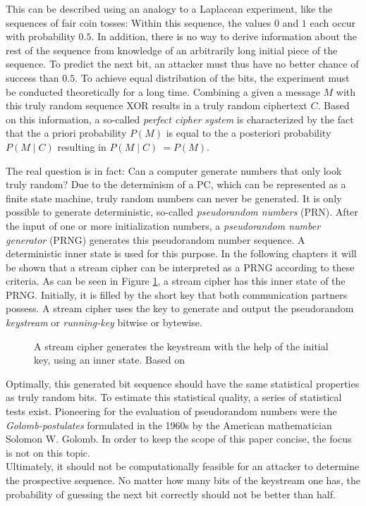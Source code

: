 This can be described using an analogy to a Laplacean experiment, like the sequences of fair coin tosses: Within this sequence, the values $0$ and $1$ each occur with probability $0.5$. In addition, there is no way to derive information about the rest of the sequence from knowledge of an arbitrarily long initial piece of the sequence. To predict the next bit, an attacker must thus have no better chance of success than $0.5$. To achieve equal distribution of the bits, the experiment must be conducted theoretically for a long time. Combining a given a message $M$ with this truly random sequence XOR results in a truly random ciphertext $C$. Based on this information, a so-called \textit{perfect cipher system} is characterized by the fact that the a priori probability $P\left(M\right)$ is equal to the a posteriori probability $P({M}\mid{C})$ resulting in $P({M}\mid{C})\ = P({M})$. \cite[pp. 52-23]{Ertel.2020}

\pagebreak

The real question is in fact: Can a computer generate numbers that only look truly random? Due to the determinism of a PC, which can be represented as a finite state machine, truly random numbers can never be generated. It is only possible to generate deterministic, so-called \textit{pseudorandom numbers} (PRN). After the input of one or more initialization numbers, a \textit{pseudorandom number generator} (PRNG) generates this pseudorandom number sequence. A deterministic inner state is used for this purpose. \cite[pp. 195-196]{Ertel.2020} In the following chapters it will be shown that a stream cipher can be interpreted as a PRNG according to these criteria. As can be seen in Figure \ref{fig:Figure_2}, a stream cipher has this inner state of the PRNG. Initially, it is filled by the short key that both communication partners possess. A stream cipher uses the key to generate and output the pseudorandom \textit{keystream} or \textit{running-key} bitwise or bytewise. \cite[p. 233]{Schneier.2006} \\

\begin{figure}[h]
	\centering
	
	\caption{A stream cipher generates the keystream with the help of the initial key, using an inner state. Based on \cite[p. 234]{Schneier.2006}}
	\label{fig:Figure_2}
\end{figure}

Optimally, this generated bit sequence should have the same statistical properties as truly random bits. To estimate this statistical quality, a series of statistical tests exist. Pioneering for the evaluation of pseudorandom numbers were the \textit{Golomb-postulates} formulated in the 1960s by the American mathematician Solomon W. Golomb. \cite[p. 43]{Golomb.1967} In order to keep the scope of this paper concise, the focus is not on this topic.\\

Ultimately, it should not be computationally feasible for an attacker to determine the prospective  sequence. No matter how many bits of the keystream one has, the probability of guessing the next bit correctly should not be better than half.
